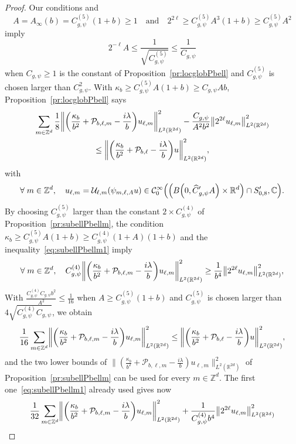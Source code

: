 \documentclass[10pt]{amsart}
\theoremstyle{definition}\newtheorem{defi}[theo]{Definition}\newtheorem{rema}[theo]{Remark}\newtheorem{exam}[theo]{Example}\newtheorem{exem}[theo]{Example}\newtheorem{nota}[theo]{Notation}
\newcommand{\C}{\mathbb{C}}
\newcommand{\Z}{\mathbb{Z}}
\newcommand{\R}{\mathbb{R}}
\newcommand{\clC}{\mathcal{C}}
\newcommand{\clP}{\mathcal{P}}
\newcommand{\clU}{\mathcal{U}}
\newcommand\norm[1]{\left\lVert#1\right\rVert}
\let\oldhat\hat
\renewcommand*{\hat}[1]{\mathchoice{\widehat{#1}}{\widehat{#1}}{\oldhat{#1}}{\oldhat{#1}}}
\let\oldforall\forall
\renewcommand*{\forall}{\mathrel{\oldforall}}
\let\originalleft\left
\let\originalright\right
\renewcommand{\left}{\mathopen{}\mathclose\bgroup\originalleft}
\renewcommand{\right}{\aftergroup\egroup\originalright}
\begin{document}
\begin{proof}
Our conditions and
\[
A=A_\infty(b)=C_{{g,\psi}}^{(5)}(1+b)\geq 1 \quad\text{and}\quad 2^{2\ell}\geq C_{g,\psi}^{(5)}A^{3}(1+b)\geq C_{{g,\psi}}^{(5)}A^{2}
\]
imply
\[
2^{-\ell}A\leq \frac{1}{\sqrt{C_{g,\psi}^{(5)}}}\leq \frac{1}{C_{g,\psi}}
\]
when $C_{g,\psi}\geq 1$ is the constant of Proposition~\ref{pr:locglobPbell} and $C_{{g,\psi}}^{(5)}$ is chosen larger than $C_{g,\psi}^{2}$. With $\kappa_{b}\geq C_{g,\psi}^{(5)}A(1+b) \geq C_{g,\psi}Ab$, Proposition~\ref{pr:locglobPbell} says
\begin{multline*}
\sum_{m\in \Z^d}\frac{1}{8}\left\| \left(\frac{\kappa_{b}}{b^{2}}+\clP_{b,\ell,m} - \frac{i\lambda}{b}\right) u_{\ell,m}\right\|^{2}_{L^2(\R^{2d})}-\frac{C_{g,\psi}}{A^2b^2}\norm{2^{2\ell}u_{\ell,m}}_{L^2(\R^{2d})}^2
\\
\leq
\left\|\left(\frac{\kappa_{b}}{b^{2}}+\clP_{b,\ell} - \frac{i\lambda}{b}\right) u \right\|^{2}_{L^2(\R^{2d})},
\end{multline*}
with
\[
\forall m\in\Z^{d},\quad u_{\ell,m}=\clU_{\ell,m}(\psi_{m,\ell,A}u) \in \clC^\infty_0\left(\left(B\left(0,\hat{C}'_{g,\psi}A\right)\times \R^d\right)\cap S_{0,8}',\C\right).
\]
By choosing $C_{g,\psi}^{(5)}$ larger than the constant $2\times C_{{g,\psi}}^{(4)}$ of Proposition~\ref{pr:subellPbellm}, the condition $\kappa_{b}\geq C_{g,\psi}^{(5)}A(1+b)\geq C_{{g,\psi}}^{(4)}(1+A)(1+b)$ and the inequality~\eqref{eq:subellPbellm1} imply
\[
\forall m\in\Z^{d},\quad C_{g,\psi}^{(4)} \left\|\left(\frac{\kappa_b}{b^2}+\clP_{b,\ell,m}-\frac{i\lambda}{b}\right)u_{\ell,m}\right\|_{L^{2}(\R^{2d})}^2 \geq \frac{1}{b^4}\left\|2^{2\ell} u_{\ell,m}\right\|^2_{L^2(\R^{2d})},
\]
With $\frac{C_{g,\psi}^{(4)}C_{g,\psi}b^{2}}{A^{2}}\leq \frac{1}{16}$ when $A\geq C_{g,\psi}^{(5)}(1+b)$ and $C_{g,\psi}^{(5)}$ is chosen larger than $4\sqrt{C_{g,\psi}^{(4)}C_{g,\psi}}$, we obtain
\[
\frac{1}{16}\sum_{m\in \Z^d}\left\| \left(\frac{\kappa_{b}}{b^{2}}+\clP_{b,\ell,m} - \frac{i\lambda}{b}\right) u_{\ell,m}\right\|^{2}_{L^2(\R^{2d})}
\leq
\left\|\left(\frac{\kappa_{b}}{b^{2}}+\clP_{b,\ell} - \frac{i\lambda}{b}\right) u \right\|^{2}_{L^2(\R^{2d})},
\]
and the two lower bounds of $\| (\frac{\kappa_{b}}{b^{2}}+\clP_{b,\ell,m} - \frac{i\lambda}{b}) u_{\ell,m}\|^{2}_{L^2(\R^{2d})}$ of Proposition~\ref{pr:subellPbellm} can be used for every $m\in\Z^{d}$. The first one~\eqref{eq:subellPbellm1} already used gives now
\begin{multline*}
\frac{1}{32}\sum_{m\in \Z^d}\left\| \left(\frac{\kappa_{b}}{b^{2}}+\clP_{b,\ell,m} - \frac{i\lambda}{b}\right) u_{\ell,m}\right\|^{2}_{L^2(\R^{2d})}+\frac{1}{C_{g,\psi}^{(4)}b^{4}}\left\|2^{2\ell}u_{\ell,m}\right\|^{2}_{L^{2}(\R^{2d})}

\end{multline*}
\end{proof}
\end{document}
